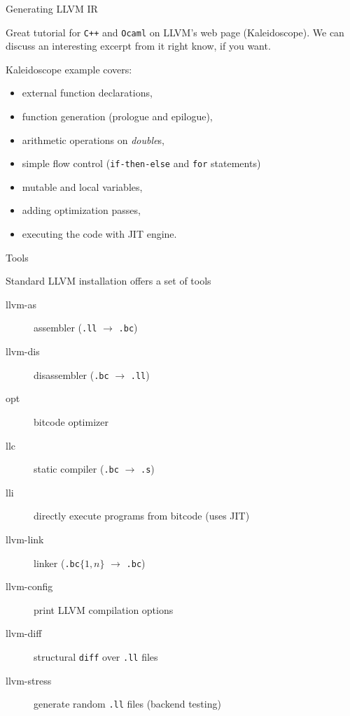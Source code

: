 \documentclass[8pt]{beamer}
\begin{document}
\begin{frame}{Generating LLVM IR}
  \begin{exampleblock}{}
    Great tutorial for \texttt{C++} and \texttt{Ocaml} on LLVM's web page
    (Kaleidoscope). We can discuss an interesting excerpt from it right know,
    if you want.
  \end{exampleblock}

  \begin{block}{Kaleidoscope example covers:}
    \begin{itemize}
      \item external function declarations,
      \item function generation (prologue and epilogue),
      \item arithmetic operations on \emph{double}s,
      \item simple flow control (\texttt{if-then-else} and \texttt{for}
        statements)
      \item mutable and local variables,
      \item adding optimization passes,
      \item executing the code with JIT engine.
    \end{itemize}
  \end{block}
\end{frame}

\begin{frame}[fragile]{Tools}
  \begin{block}{Standard LLVM installation offers a set of tools}
    \begin{description}
      \item[llvm-as] assembler (\verb+.ll+ $\rightarrow$ \verb+.bc+)
      \item[llvm-dis] disassembler (\verb+.bc+ $\rightarrow$ \verb+.ll+)
      \item[opt] bitcode optimizer
      \item[llc] static compiler (\verb+.bc+ $\rightarrow$ \verb+.s+)
      \item[lli] directly execute programs from bitcode (uses JIT)
      \item[llvm-link] linker (\verb+.bc+$\{1,n\}$ $\rightarrow$ \verb+.bc+)
      \item[llvm-config] print LLVM compilation options
      \item[llvm-diff] structural \verb+diff+ over \verb+.ll+ files
      \item[llvm-stress] generate random \verb+.ll+ files (backend testing)
    \end{description}
  \end{block}
\end{frame}
\end{document}
